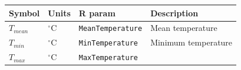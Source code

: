 \documentclass[]{book}
\begin{document}
\begin{longtable}[]{@{}llll@{}}
\toprule
\begin{minipage}[b]{0.11\columnwidth}\raggedright
Symbol\strut
\end{minipage} & \begin{minipage}[b]{0.10\columnwidth}\raggedright
Units\strut
\end{minipage} & \begin{minipage}[b]{0.12\columnwidth}\raggedright
R param\strut
\end{minipage} & \begin{minipage}[b]{0.45\columnwidth}\raggedright
Description\strut
\end{minipage}\tabularnewline
\midrule
\endhead
\begin{minipage}[t]{0.11\columnwidth}\raggedright
\(T_{mean}\)\strut
\end{minipage} & \begin{minipage}[t]{0.10\columnwidth}\raggedright
\(^{\circ} \mathrm{C}\)\strut
\end{minipage} & \begin{minipage}[t]{0.12\columnwidth}\raggedright
\texttt{MeanTemperature}\strut
\end{minipage} & \begin{minipage}[t]{0.45\columnwidth}\raggedright
Mean temperature\strut
\end{minipage}\tabularnewline
\begin{minipage}[t]{0.11\columnwidth}\raggedright
\(T_{min}\)\strut
\end{minipage} & \begin{minipage}[t]{0.10\columnwidth}\raggedright
\(^{\circ} \mathrm{C}\)\strut
\end{minipage} & \begin{minipage}[t]{0.12\columnwidth}\raggedright
\texttt{MinTemperature}\strut
\end{minipage} & \begin{minipage}[t]{0.45\columnwidth}\raggedright
Minimum temperature\strut
\end{minipage}\tabularnewline
\begin{minipage}[t]{0.11\columnwidth}\raggedright
\(T_{max}\)\strut
\end{minipage} & \begin{minipage}[t]{0.10\columnwidth}\raggedright
\(^{\circ} \mathrm{C}\)\strut
\end{minipage} & \begin{minipage}[t]{0.12\columnwidth}\raggedright
\texttt{MaxTemperature}\strut

\end{minipage}
\end{longtable}
\end{document}
